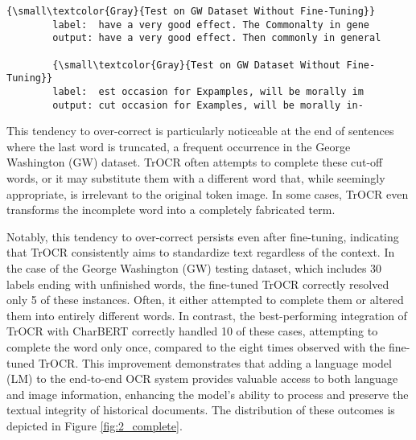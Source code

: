 \begin{center}
    \begin{minipage}{1.0\textwidth}
    \begin{Verbatim}[commandchars=\\\{\}]
        {\small\textcolor{Gray}{Test on GW Dataset Without Fine-Tuning}}
        label:  have a very good effect. The Commonalty in gene
        output: have a very good effect. Then commonly in general

        {\small\textcolor{Gray}{Test on GW Dataset Without Fine-Tuning}}
        label:  est occasion for Expamples, will be morally im 
        output: cut occasion for Examples, will be morally in-
    \end{Verbatim}
    \end{minipage}
\end{center}

This tendency to over-correct is particularly noticeable at the end of sentences where the last word is truncated, a frequent occurrence in the George Washington (GW) dataset. TrOCR often attempts to complete these cut-off words, or it may substitute them with a different word that, while seemingly appropriate, is irrelevant to the original token image. In some cases, TrOCR even transforms the incomplete word into a completely fabricated term.

Notably, this tendency to over-correct persists even after fine-tuning, indicating that TrOCR consistently aims to standardize text regardless of the context. In the case of the George Washington (GW) testing dataset, which includes 30 labels ending with unfinished words, the fine-tuned TrOCR correctly resolved only 5 of these instances. Often, it either attempted to complete them or altered them into entirely different words. In contrast, the best-performing integration of TrOCR with CharBERT correctly handled 10 of these cases, attempting to complete the word only once, compared to the eight times observed with the fine-tuned TrOCR. This improvement demonstrates that adding a language model (LM) to the end-to-end OCR system provides valuable access to both language and image information, enhancing the model's ability to process and preserve the textual integrity of historical documents. The distribution of these outcomes is depicted in Figure \ref{fig:2_complete}.


